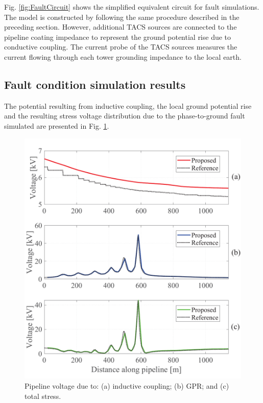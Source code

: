 \documentclass{IEEEtran4PSCC}
\begin{document}
Fig. \ref{fig:FaultCircuit} shows the simplified equivalent circuit for fault simulations. The model is constructed by following the same procedure described in the preceding section. However, additional TACS sources are connected to the pipeline coating impedance to represent the ground potential rise due to conductive coupling. The current probe of the TACS sources measures the current flowing through each tower grounding impedance to the local earth.

\subsection{Fault condition simulation results}

The potential resulting from inductive coupling, the local ground potential rise and the resulting stress voltage distribution due to the phase-to-ground fault simulated are presented in Fig. \ref{fig:Faultvoltage}.

\begin{figure}[hbt]
	\begin{center}
		\includegraphics[width=1\columnwidth]{./fig/Fault_voltage2.pdf}
		\caption{Pipeline voltage due to: (a) inductive coupling; (b) GPR; and (c) total stress.}
		\label{fig:Faultvoltage}
	\end{center}
\end{figure}
\end{document}
